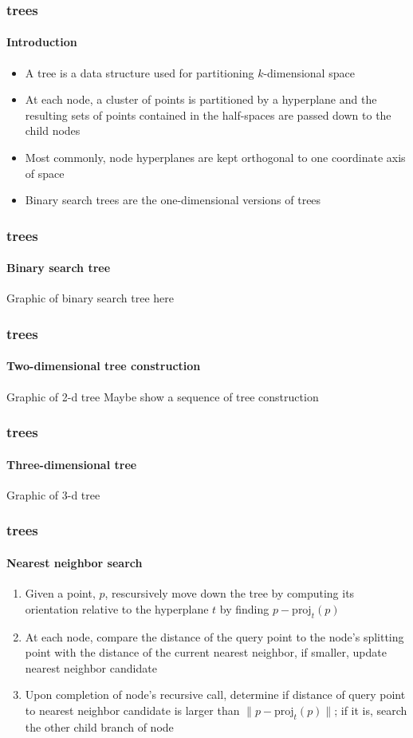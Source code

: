 

\begin{frame}
  \frametitle{\kd trees}
  \framesubtitle{Introduction}

  \begin{itemize}
    \item A \kd tree is a data structure used for partitioning $k$-dimensional space
    \item At each node, a cluster of points is partitioned by a hyperplane and the resulting
      sets of points contained in the half-spaces are passed down to the child nodes
    \item Most commonly, node hyperplanes are kept orthogonal to one coordinate axis of space
    \item Binary search trees are the one-dimensional versions of \kd trees
  \end{itemize}

\end{frame}

\begin{frame}
  \frametitle{\kd trees}
  \framesubtitle{Binary search tree}
  
  Graphic of binary search tree here
  
\end{frame}

\begin{frame}
  \frametitle{\kd trees}
  \framesubtitle{Two-dimensional \kd tree construction}
  
  Graphic of 2-d tree
  Maybe show a sequence of tree construction 
  
\end{frame}

\begin{frame}
  \frametitle{\kd trees}
  \framesubtitle{Three-dimensional \kd tree}
  
  Graphic of 3-d tree
  
\end{frame}

\begin{frame}
  \frametitle{\kd trees}
  \framesubtitle{Nearest neighbor search}

  \begin{enumerate}
    \item Given a point, $p$, rescursively move down the tree by computing its orientation relative to the 
      hyperplane $t$ by finding $p - \text{proj}_t(p)$
    \item At each node, compare the distance of the query point to the node's splitting point with the distance
      of the current nearest neighbor, if smaller, update nearest neighbor candidate
    \item Upon completion of node's recursive call, determine if distance of query point to nearest neighbor 
      candidate is larger than $\|p - \text{proj}_t(p)\|$; if it is, search the other child branch of node
  \end{enumerate}

\end{frame}

